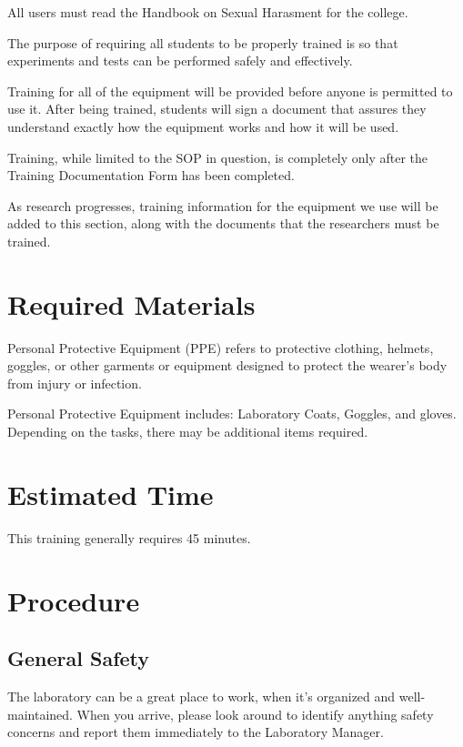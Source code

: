 \documentclass[12pt]{../SOP4_alpha}\usepackage[]{graphicx}\usepackage[]{xcolor}
\begin{document}
\NP All users must read the Handbook on Sexual Harasment for the college.

\NP The purpose of requiring all students to be properly trained is so that experiments and tests can be performed safely and effectively.  

\NP Training for all of the equipment will be provided before anyone is permitted to use it.  After being trained, students will sign a document that assures they understand exactly how the equipment works and how it will be used.

\NP Training, while limited to the SOP in question, is completely only after the Training Documentation Form has been completed.

\NP As research progresses, training information for the equipment we use will be added to this section, along with the documents that the researchers must be trained.

\section{Required Materials}

\NP Personal Protective Equipment (PPE) refers to protective clothing, helmets, goggles, or other garments or equipment designed to protect the wearer's body from injury or infection. 

\NP Personal Protective Equipment includes: Laboratory Coats, Goggles, and gloves. Depending on the tasks, there may be additional items required.

\section{Estimated Time}

\NP This training generally requires 45 minutes.

\section{Procedure}

\subsection*{General Safety}

\NP The laboratory can be a great place to work, when it's organized and well-maintained. When you arrive, please look around to identify anything safety concerns and report them immediately to the Laboratory Manager. 
\end{document}
